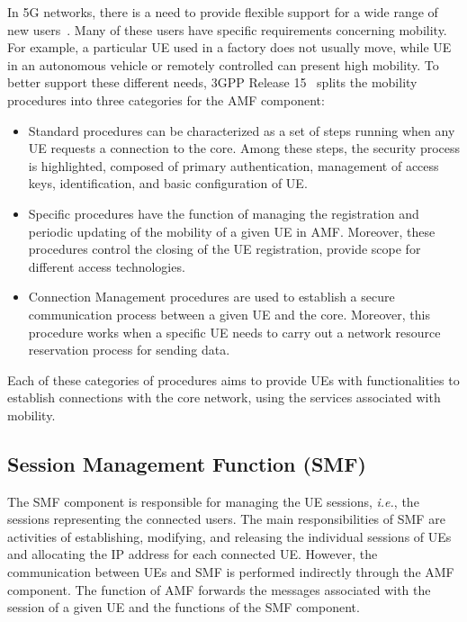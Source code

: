 In 5G networks, there is a need to provide flexible support for a wide range of new users~\cite{foukas2017network}. Many of these users have specific requirements concerning mobility. For example, a particular UE used in a factory does not usually move, while UE in an autonomous vehicle or remotely controlled can present high mobility. To better support these different needs, 3GPP Release 15~\cite{3gpp:rel15nr21.915} splits the mobility procedures into three categories for the AMF component:

 \begin{itemize}
  \item Standard procedures can be characterized as a set of steps running when any UE requests a connection to the core. Among these steps, the security process is highlighted, composed of primary authentication, management of access keys, identification, and basic configuration of UE.
  \item Specific procedures have the function of managing the registration and periodic updating of the mobility of a given UE in AMF. Moreover, these procedures control the closing of the UE registration, provide scope for different access technologies. 
  \item Connection Management procedures are used to establish a secure communication process between a given UE and the core. Moreover, this procedure works when a specific UE needs to carry out a network resource reservation process for sending data.
\end{itemize}

Each of these categories of procedures aims to provide UEs with functionalities to establish connections with the core network, using the services associated with mobility.


\subsection*{Session Management Function (SMF)} 

The SMF component is responsible for managing the UE sessions, \textit{i.e.}, the sessions representing the connected users. The main responsibilities of SMF are activities of establishing, modifying, and releasing the individual sessions of UEs and allocating the IP address for each connected UE. However, the communication between UEs and SMF is performed indirectly through the AMF component. The function of AMF forwards the messages associated with the session of a given UE and the functions of the SMF component.

